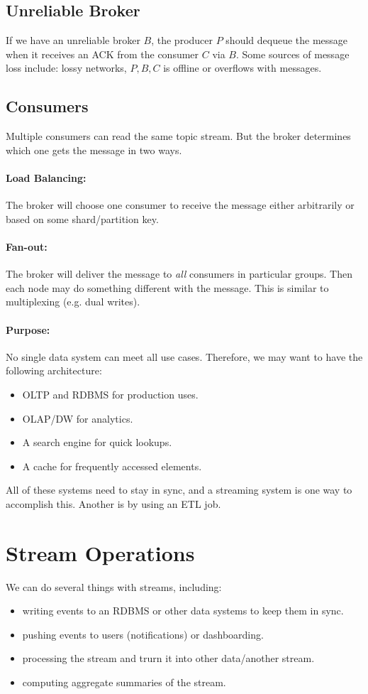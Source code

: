 \documentclass{report}
\renewcommand{\it}[1]{\textit{{#1}}}
\begin{document}
\subsection{Unreliable Broker}
If we have an unreliable broker $B$, the producer $P$ should dequeue the message
when it receives an ACK from the consumer $C$ via $B$. Some sources of message
loss include: lossy networks, $P, B, C$ is offline or overflows with messages.

\subsection{Consumers}
Multiple consumers can read the same topic stream. But the broker determines
which one gets the message in two ways.

\paragraph{Load Balancing:} The broker will choose one consumer to receive the
message either arbitrarily or based on some shard/partition key.

\paragraph{Fan-out:} The broker will deliver the message to \it{all} consumers
in particular groups. Then each node may do something different with the
message. This is similar to multiplexing (e.g. dual writes).

\paragraph{Purpose:} No single data system can meet all use cases. Therefore, we
may want to have the following architecture:
\begin{itemize}[label=$\to$]
    \item OLTP and RDBMS for production uses.
    \item OLAP/DW for analytics.
    \item A search engine for quick lookups.
    \item A cache for frequently accessed elements.
\end{itemize}

All of these systems need to stay in sync, and a streaming system is one way to
accomplish this. Another is by using an ETL job.

\section{Stream Operations}
We can do several things with streams, including:
\begin{itemize}[label=$\to$]
    \item writing events to an RDBMS or other data systems to keep them in sync.
    \item pushing events to users (notifications) or dashboarding.
    \item processing the stream and trurn it into other data/another stream.
    \item computing aggregate summaries of the stream.
\end{itemize}
\end{document}
